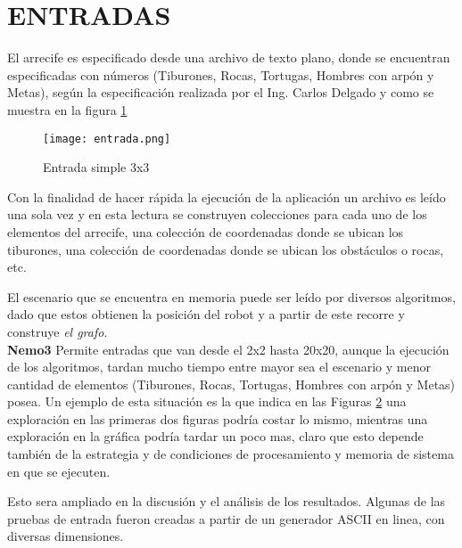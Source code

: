 \section{ENTRADAS}

El arrecife es especificado desde una archivo de texto plano, donde se encuentran especificadas con n\'umeros (Tiburones, Rocas, Tortugas, Hombres con arp\'on y Metas), seg\'un la especificaci\'on realizada por el Ing. Carlos Delgado y como se muestra en la figura \ref{fig:entrada}
\begin{figure}[!h]
	\centering
	\texttt{[image: entrada.png]}
	\caption{Entrada simple 3x3}
	\label{fig:entrada}
\end{figure}

Con la finalidad de hacer r\'apida la ejecuci\'on de la aplicaci\'on un archivo es le\'ido una sola vez y en esta lectura se construyen colecciones para cada uno de los elementos del arrecife, una colecci\'on de coordenadas donde se ubican los tiburones, una colecci\'on de coordenadas donde se ubican los obst\'aculos o rocas, etc.

El escenario que se encuentra en memoria puede ser le\'ido por diversos algoritmos, dado que estos obtienen la posici\'on del robot y a partir de este recorre y construye \textit{el grafo}.\\

\textbf{Nemo3} Permite entradas que van desde el 2x2 hasta 20x20, aunque la ejecuci\'on de los algoritmos, tardan mucho tiempo entre mayor sea el escenario y menor cantidad de elementos (Tiburones, Rocas, Tortugas, Hombres con arp\'on y Metas) posea. Un ejemplo de esta situaci\'on es la que indica en las Figuras \ref{fig:areas} una exploraci\'on en las primeras dos figuras podr\'ia costar lo mismo, mientras una exploraci\'on en la gr\'afica podr\'ia tardar un poco mas, claro que esto depende tambi\'en de la estrategia y de condiciones de procesamiento y memoria de sistema en que se ejecuten.
\begin{figure}[!h]
	\centering
	\qquad
	\label{fig:areas}
\end{figure}

Esto sera ampliado en la discusi\'on y el an\'alisis de los resultados. Algunas de las pruebas de entrada fueron creadas a partir de un generador ASCII en linea, con diversas dimensiones.